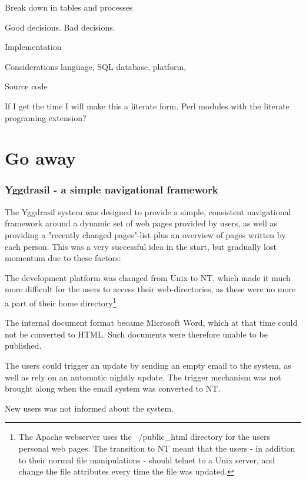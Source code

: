    Break down in tables and processes

   Good decisions. Bad decisions.


   Implementation

   Considerations language, SQL database, platform,


   Source code

   If I get the time I will make this a literate form. Perl modules with
   the literate programing extension?







\chapter{Go away}




\subsection{Yggdrasil - a simple navigational framework}
\label{sec:yggdrasil}


The Yggdrasil system was designed to provide a simple, consistent
navigational framework around a dynamic set of web pages provided by
users, as well as providing a "recently changed pages"-list plus an
overview of pages written by each person.  This was a very successful
idea in the start, but gradually lost momentum due to these factors:

The development platform was changed from Unix to NT, which made it
much more difficult for the users to access their web-directories, as
these were no more a part of their home directory\footnote{The Apache
  webserver uses the ~/public\_html directory for the users personal
  web pages.  The transition to NT meant that the users - in addition
  to their normal file manipulations - should telnet to a Unix server,
  and change the file attributes every time the file was updated.  }

The internal document format became Microsoft Word, which at that time
could not be converted to HTML.  Such documents were therefore unable
to be published.

The users could trigger an update by sending an empty email to the
system, as well as rely on an automatic nightly update.  The trigger
mechanism was not brought along when the email system was converted to
NT.

New users was not informed about the system.














